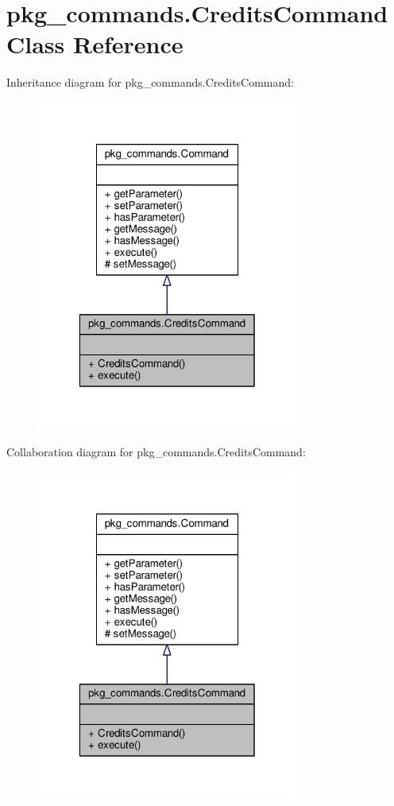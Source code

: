\hypertarget{classpkg__commands_1_1CreditsCommand}{\section{pkg\-\_\-commands.\-Credits\-Command Class Reference}
\label{classpkg__commands_1_1CreditsCommand}
}


Inheritance diagram for pkg\-\_\-commands.\-Credits\-Command\-:
\nopagebreak
\begin{figure}[H]
\begin{center}
\leavevmode
\includegraphics[width=244pt]{classpkg__commands_1_1CreditsCommand__inherit__graph}
\end{center}
\end{figure}


Collaboration diagram for pkg\-\_\-commands.\-Credits\-Command\-:
\nopagebreak
\begin{figure}[H]
\begin{center}
\leavevmode
\includegraphics[width=244pt]{classpkg__commands_1_1CreditsCommand__coll__graph}
\end{center}
\end{figure}
